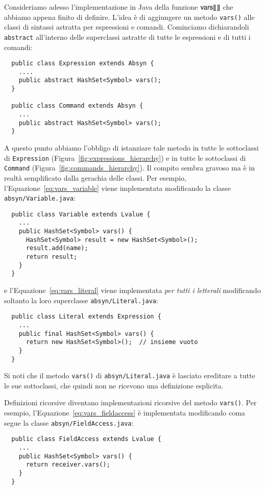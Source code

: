 Consideriamo adesso l'implementazione in Java della funzione
${\mathsf{vars}[\![{}]\!]}$ che abbiamo appena finito di definire. L'idea \`e di aggiungere
un metodo \texttt{vars()} alle classi di sintassi astratta per
espressioni e comandi. Cominciamo dichiarandoli \texttt{abstract}
all'interno delle superclassi astratte di tutte le espressioni e di
tutti i comandi:
%
\begin{verbatim}
  public class Expression extends Absyn {
    ....
    public abstract HashSet<Symbol> vars();
  }

  public class Command extends Absyn {
    ...
    public abstract HashSet<Symbol> vars();
  }
\end{verbatim}
%
A questo punto abbiamo l'obbligo di istanziare tale metodo in tutte
le sottoclassi di \texttt{Expression} (Figura~\ref{fig:expressions_hierarchy})
e in tutte le sottoclassi di \texttt{Command}
(Figura~\ref{fig:commands_hierarchy}). Il compito sembra gravoso ma \`e
in realt\`a semplificato dalla gerachia delle classi. Per esempio,
l'Equazione~\eqref{eq:vars_variable} viene implementata modificando la
classe \texttt{absyn/Variable.java}:
%
\begin{verbatim}
  public class Variable extends Lvalue {
    ...
    public HashSet<Symbol> vars() {
      HashSet<Symbol> result = new HashSet<Symbol>();
      result.add(name);
      return result;
    }
  }
\end{verbatim}
%
e l'Equazione~\eqref{eq:vars_literal} viene implementata
\emph{per tutti i letterali} modificando soltanto
la loro superclasse \texttt{absyn/Literal.java}:
%
\begin{verbatim}
  public class Literal extends Expression {
    ...
    public final HashSet<Symbol> vars() {
      return new HashSet<Symbol>();  // insieme vuoto
    }
  }
\end{verbatim}
%
Si noti che il metodo \texttt{vars()} di \texttt{absyn/Literal.java} \`e
lasciato ereditare a tutte le sue sottoclassi, che quindi non ne ricevono
una definizione esplicita.

Definizioni ricorsive diventano implementazioni ricorsive del metodo
\texttt{vars()}. Per esempio, l'Equazione~\eqref{eq:vars_fieldaccess}
\`e implementata modificando coma segue
la classe \texttt{absyn/FieldAccess.java}:
%
\begin{verbatim}
  public class FieldAccess extends Lvalue {
    ...
    public HashSet<Symbol> vars() {
      return receiver.vars();
    }
  }
\end{verbatim}

